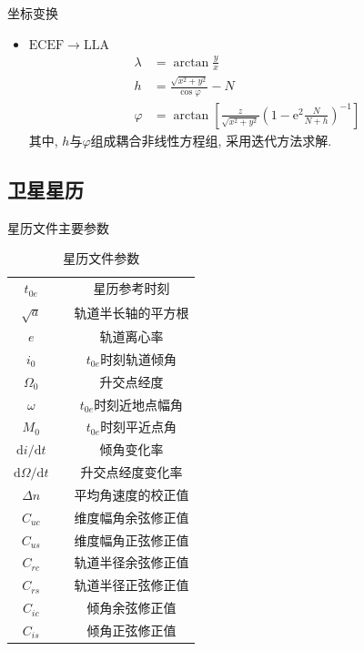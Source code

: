 \begin{frame}{坐标变换}
    \begin{itemize}
        \item $\mathrm{ECEF} \rightarrow \mathrm{LLA}$
        \begin{align*}
            \lambda &= \arctan \frac{ y }{ x } \\
            h &= \frac{ \sqrt{ x ^ 2 + y ^ 2 } }{ \cos \varphi } - N \\
            \varphi &= \arctan \left[ \frac{ z }{ \sqrt{ x ^ 2 + y ^ 2 } }
            \left( 1 - \mathrm e ^ 2 \frac{ N }{ N + h } \right) ^ { -1 }\right]
        \end{align*}
        其中, $h$与$\varphi$组成耦合非线性方程组, 采用迭代方法求解.
    \end{itemize}
\end{frame}

\subsection{卫星星历}
\begin{frame}{星历文件主要参数}
\begin{table}[h!]
    \centering
    \footnotesize
    \caption{星历文件参数}
    \begin{tabular}{ccc}
        \hline
        $t _ { 0e }$ && 星历参考时刻 \\
        $\sqrt{ a }$ && 轨道半长轴的平方根 \\
        $e$ && 轨道离心率 \\
        $i _ 0$ && $t _ { 0e }$时刻轨道倾角 \\
        $\Omega _ 0$ && 升交点经度 \\
        $\omega$ && $t _ { 0e }$时刻近地点幅角 \\
        $M _ 0$ && $t _ { 0e }$时刻平近点角 \\
        $\mathrm d i / \mathrm d t$ && 倾角变化率 \\
        $\mathrm d \Omega / \mathrm d t$ && 升交点经度变化率 \\
        $\Delta n$ && 平均角速度的校正值 \\
        $C _ { uc }$ && 维度幅角余弦修正值 \\
        $C _ { us }$ && 维度幅角正弦修正值 \\
        $C _ { rc }$ && 轨道半径余弦修正值 \\
        $C _ { rs }$ && 轨道半径正弦修正值 \\
        $C _ { ic }$ && 倾角余弦修正值 \\
        $C _ { is }$ && 倾角正弦修正值 \\
        \hline
    \end{tabular}
    \label{tab:ephemeris_para}
\end{table}
\end{frame}

